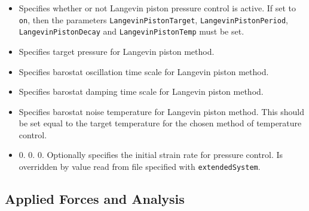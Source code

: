 \begin{itemize}

\item
{}
{Specifies whether or not Langevin piston pressure control is active.  
If set to {\tt on}, then the parameters {\tt LangevinPistonTarget}, {\tt LangevinPistonPeriod}, {\tt LangevinPistonDecay} and {\tt LangevinPistonTemp} must be set.}

\item
{}
{Specifies target pressure for Langevin piston method.}

\item
{}
{Specifies barostat oscillation time scale for Langevin piston method.}

\item
{}
{Specifies barostat damping time scale for Langevin piston method.}

\item
{}
{Specifies barostat noise temperature for Langevin piston method.
This should be set equal to the target temperature for the chosen method of temperature control.}

\item
{}
{0. 0. 0.}
{Optionally specifies the initial strain rate for pressure control.
Is overridden by value read from file specified with {\tt extendedSystem}.}

\end{itemize}

\subsection{Applied Forces and Analysis}

